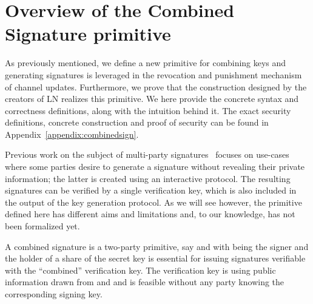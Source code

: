 \section{Overview of the Combined Signature primitive}
\label{sec:ov-combined-ds}
  As previously mentioned, we define a new primitive for combining keys and
  generating signatures is leveraged in the revocation and
  punishment mechanism of channel updates. Furthermore, we prove that the
  construction designed by the creators of LN realizes this primitive. We here
  provide the concrete syntax and correctness definitions, along with the
  intuition behind it. The exact security definitions, concrete construction and
  proof of security can be found in Appendix~\ref{appendix:combinedsign}.

  Previous work on the subject of multi-party
  signatures~\cite{DBLP:conf/ndss/NicolosiKDM03,DBLP:journals/iacr/BellareS01,boyd1986digital,DBLP:conf/ndss/Ganesan95a,DBLP:conf/crypto/MacKenzieR01,ganesan1994secure}
  focuses on use-cases where some parties desire to generate a signature without
  revealing their private information; the latter is created using an
  interactive protocol. The resulting signatures can be verified by a single
  verification key, which is also included in the output of the key generation
  protocol. As we will see however, the primitive defined here has different
  aims and limitations and, to our knowledge, has not been formalized yet.

  A combined signature is a two-party primitive, say  \alice{}
  and \bob\redden{,} with \bob{} being the signer and \alice{} the holder of a
  share of the secret key is essential for issuing
  signatures verifiable with the ``combined''
  verification key. The verification key is  using public
  information drawn from \alice{} and \bob{} and is feasible without any party
  knowing the corresponding signing key. 

